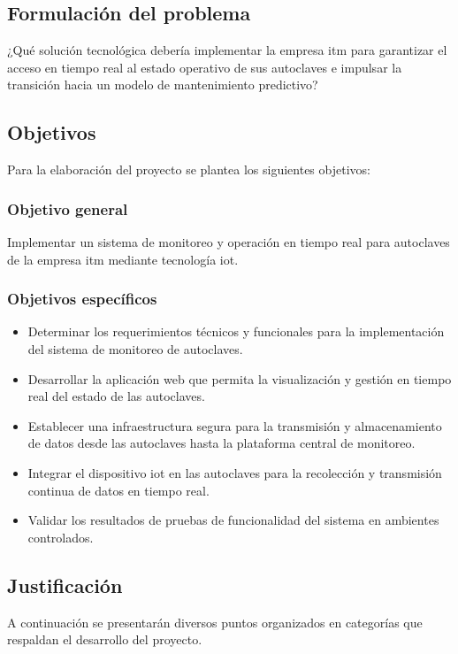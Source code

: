 \subsection*{Formulación del problema}
¿Qué solución tecnológica debería implementar la empresa \acrshort{itm} para garantizar el acceso en tiempo real al estado operativo de sus autoclaves e impulsar la transición hacia un modelo de mantenimiento predictivo?
 
\subsection*{Objetivos}
Para la elaboración del proyecto se plantea los siguientes objetivos:
\subsubsection*{Objetivo general}

Implementar un sistema de monitoreo y operación en tiempo real para autoclaves de la empresa \acrshort{itm} mediante tecnología \acrshort{iot}.

\subsubsection*{Objetivos específicos}

\begin{itemize}
\item Determinar los requerimientos técnicos y funcionales para la implementación del sistema de monitoreo de autoclaves.
\item Desarrollar la aplicación web que permita la visualización y gestión en tiempo real del estado de las autoclaves.
\item Establecer una infraestructura segura para la transmisión y almacenamiento de datos desde las autoclaves hasta la plataforma central de monitoreo.
\item Integrar el dispositivo \acrshort{iot} en las autoclaves para la recolección y transmisión continua de datos en tiempo real.
\item Validar los resultados de pruebas de funcionalidad del sistema en ambientes controlados.
\end{itemize}

\subsection*{Justificación}
A continuación se presentarán diversos puntos organizados en categorías que respaldan el desarrollo del proyecto.

